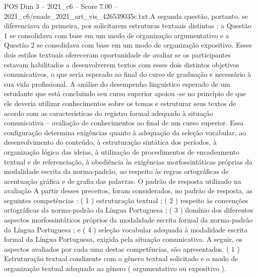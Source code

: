 \begin{textsample}{POS Dim 3 – 2021\_c6 – Score 7.00 – 2021\_c6/enade\_2021\_art\_vis\_426539035c.txt}
A segunda questão, portanto, se diferenciava da primeira, por solicitarem estruturas textuais distintas : a Questão 1 se consolidava com base em um modo de organização argumentativo e a Questão 2 se consolidava com base em um modo de organização expositivo.
Esses dois estilos textuais ofereceram oportunidade de avaliar se os participantes estavam habilitados a desenvolverem textos com esses dois distintos objetivos comunicativos, o que seria esperado ao final do curso de graduação e necessário à sua vida profissional.
A análise do desempenho linguístico esperado de um estudante que está concluindo seu curso superior apoiou -se no princípio de que ele deveria utilizar conhecimentos sobre os temas e estruturar seus textos de acordo com as características do registro formal adequado à situação comunicativa – avaliação de conhecimentos ao final de um curso superior.
Essa configuração determina exigências quanto à adequação da seleção vocabular, ao desenvolvimento do conteúdo, à estruturação sintática dos períodos, à organização lógica das ideias, à utilização de procedimentos de encadeamento textual e de referenciação, à obediência às exigências morfossintáticas próprias da modalidade escrita da norma-padrão, ao respeito às regras ortográficas de acentuação gráfica e de grafia das palavras.
O padrão de resposta utilizado na avaliação A partir desses preceitos, foram considerados, no padrão de resposta, as seguintes competências : ( 1 ) estruturação textual ; ( 2 ) respeito às convenções ortográficas da norma-padrão da Língua Portuguesa ; ( 3 ) domínio dos diferentes aspectos morfossintáticos próprios da modalidade escrita formal da norma-padrão da Língua Portuguesa ; e ( 4 ) seleção vocabular adequada à modalidade escrita formal da Língua Portuguesa, exigida pela situação comunicativa.
A seguir, os aspectos avaliados por cada uma destas competências, são apresentados. ( 1 ) Estruturação textual condizente com o gênero textual solicitado e o modo de organização textual adequado ao gênero ( argumentativo ou expositivo ).

\end{textsample}

